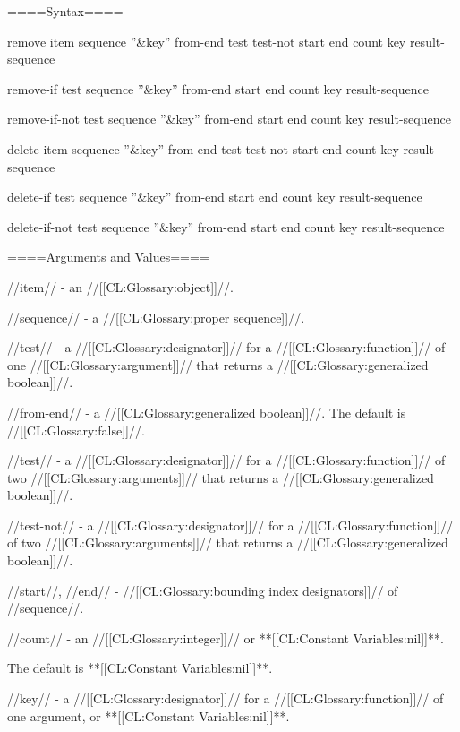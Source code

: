 
====Syntax====

\DefunWithValues remove {item sequence ''&key'' from-end test test-not start end count key} {result-sequence}

\DefunWithValues remove-if {test sequence ''&key'' from-end start end count key} {result-sequence}

\DefunWithValues remove-if-not {test sequence ''&key'' from-end start end count key} {result-sequence}

\DefunWithValues delete {item sequence ''&key'' from-end test test-not start end count key} {result-sequence}

\DefunWithValues delete-if {test sequence ''&key'' from-end start end count key} {result-sequence}

\DefunWithValues delete-if-not {test sequence ''&key'' from-end start end count key} {result-sequence}

====Arguments and Values====

//item// - an //[[CL:Glossary:object]]//.

//sequence// - a //[[CL:Glossary:proper sequence]]//.

//test// - a //[[CL:Glossary:designator]]// for a //[[CL:Glossary:function]]// of one //[[CL:Glossary:argument]]// that returns a //[[CL:Glossary:generalized boolean]]//.

//from-end// - a //[[CL:Glossary:generalized boolean]]//. The default is //[[CL:Glossary:false]]//.

//test// - a //[[CL:Glossary:designator]]// for a //[[CL:Glossary:function]]// of two //[[CL:Glossary:arguments]]// that returns a //[[CL:Glossary:generalized boolean]]//.

//test-not// - a //[[CL:Glossary:designator]]// for a //[[CL:Glossary:function]]// of two //[[CL:Glossary:arguments]]// that returns a //[[CL:Glossary:generalized boolean]]//.

//start//, //end// - //[[CL:Glossary:bounding index designators]]// of //sequence//. 

//count// - an //[[CL:Glossary:integer]]// or **[[CL:Constant Variables:nil]]**.

The default is **[[CL:Constant Variables:nil]]**.

//key// - a //[[CL:Glossary:designator]]// for a //[[CL:Glossary:function]]// of one argument, or **[[CL:Constant Variables:nil]]**.

